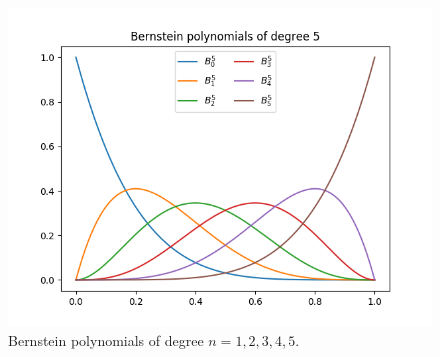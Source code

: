 \begin{figure}[ht!]
\begin{minipage}[t]{0.43\textwidth}
  \includegraphics[width=1.0\textwidth]{figures/cad/all_bernstein_degree_5}
\end{minipage}
\caption{Bernstein polynomials of degree $n = 1, 2, 3, 4, 5$.}
  \label{fig:bernstein}
\end{figure}

%



